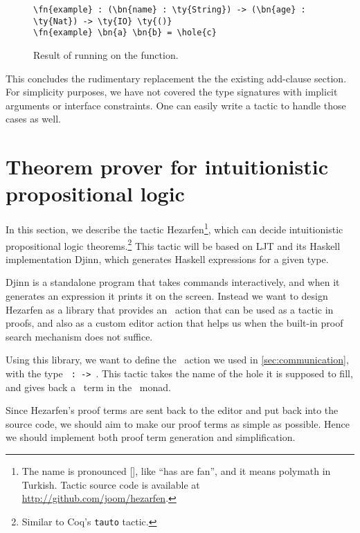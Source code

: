 \begin{figure}[ht]
\caption{Result of running  on the  function.}
\label{code:exampleAddClause2}
\begin{Verbatim}[framesep=2mm, label=\footnotesize{\normalfont{Idris}}, labelposition=topline]
\fn{example} : (\bn{name} : \ty{String}) -> (\bn{age} : \ty{Nat}) -> \ty{IO} \ty{()}
\fn{example} \bn{a} \bn{b} = \hole{c}
\end{Verbatim}
\end{figure}

This concludes the rudimentary replacement the the existing add-clause section.
For simplicity purposes, we have not covered the type signatures with implicit
arguments or interface constraints. One can easily write a tactic to handle
those cases as well.

\section{Theorem prover for intuitionistic propositional logic}\label{sec:hezarfen}

In this section, we describe the tactic Hezarfen\footnote{ The name is
  pronounced {[]}, like ``has are fan'', and it means
    polymath in Turkish.  Tactic source code is available at
    \url{http://github.com/joom/hezarfen}.}, which can decide intuitionistic
propositional logic theorems.\footnote{Similar to Coq's \texttt{tauto} tactic.}
This tactic will be based on LJT\cite{ljt} and its Haskell
implementation Djinn\cite{djinn}, which generates Haskell expressions
for a given type.

Djinn is a standalone program that takes commands
interactively, and when it generates an expression it prints it on the screen.
Instead we want to design Hezarfen as a library that provides an \Elab\ action
that can be used as a tactic in proofs, and also as a custom editor action that
helps us when the built-in proof search mechanism does not suffice.

Using this library, we want to define the \Elab\ action we used in
\autoref{sec:communication}, with the type
\texttt{ :  ->  }.
This tactic takes the name of the hole it is supposed to fill, and gives back a
\TT\ term in the \Elab\ monad.

Since Hezarfen's proof terms are sent back to the editor and put back into the
source code, we should aim to make our proof terms as simple as possible.
Hence we should implement both proof term generation and simplification.

